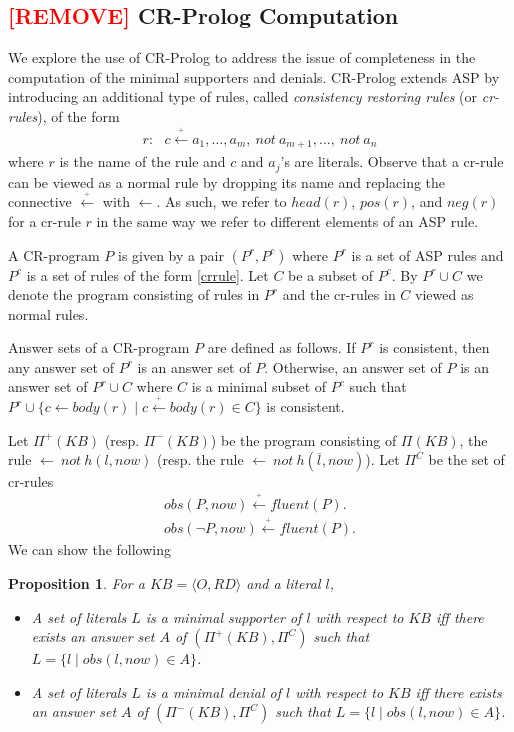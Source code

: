 \documentclass{article}
\newtheorem{proposition}[theorem]{Proposition}
\def\naf{\: {not} \:}
\def\cra{\stackrel{_+}{\leftarrow}}
\begin{document}
\subsection{\textcolor{red}{[REMOVE]} CR-Prolog Computation}
%
%
We explore the use of CR-Prolog to address the issue of completeness in the computation of
the minimal supporters and denials.
CR-Prolog extends ASP by introducing an additional type of rules, called 
{\em consistency restoring rules} (or {\em cr-rules}), of the form  %
\begin{eqnarray} 
r: \:\:\:
c  \cra a_1,\ldots,a_m,\naf a_{m+1},\ldots,\naf a_n  \label{crrule} 
\end{eqnarray} %
where $r$ is the name of the rule and $c$  and $a_j$'s are 
literals. Observe that 
a cr-rule can be viewed as a normal rule by dropping its name 
and replacing the connective $\cra$ with $\leftarrow$. As such, we refer 
to $head(r)$, $pos(r)$, and $neg(r)$ for a cr-rule $r$ in the same way we refer to different elements of an
ASP rule.

A CR-program $P$ is given by a pair $(P^r,P^c)$ where $P^r$ is a 
set of ASP rules  and $P^c$ is a set
of rules of the form \eqref{crrule}. Let $C$ be a subset of $P^c$.
By $P^r \cup C$ we denote the program consisting of rules in $P^r$
and the cr-rules in $C$ viewed as normal rules. 

Answer sets of a CR-program $P$ are defined 
as follows. If $P^r$ is consistent, then any answer set of $P^r$ 
is an answer set of $P$. Otherwise, an answer set of $P$ is 
an answer set of $P^r \cup C$ where $C$ is a minimal subset
of $P^c$ such that $P^r \cup 
\{c \leftarrow body(r) \mid c \cra body(r) \in C\}$ 
is consistent. 

Let $\Pi^+(KB)$ (resp. $\Pi^-(KB)$) be the program consisting of $\Pi(KB)$, the rule 
$\leftarrow  \naf h(l, now)$ (resp. the rule $\leftarrow  \naf h(\overline{l}, now)$). 
Let $\Pi^C$ be  the set of cr-rules 
\begin{align} 
obs(P, now) \cra fluent(P). \label{lp:cra1} \\
obs(\neg P, now) \cra fluent(P). \label{lp:cra2} 
\end{align} 
We can show the following 
\begin{proposition} 
        For a $KB = \langle O, RD \rangle$ and a literal $l$, 
        \begin{itemize}
                \item A set of literals $L$  is a minimal supporter of $l$ with respect to $KB$ iff there exists an 
                answer set $A$ of $(\Pi^+(KB),\Pi^C)$ such that $L = \{l \mid obs(l, now) \in A\}$.
                
                \item A set of literals $L$  is a minimal denial of $l$ with respect to $KB$ iff there exists an 
                answer set $A$ of $(\Pi^-(KB),\Pi^C)$ such that $L = \{l \mid obs(l, now) \in A\}$.
                
        \end{itemize} 
\end{proposition}
\fi
 
\end{document}
